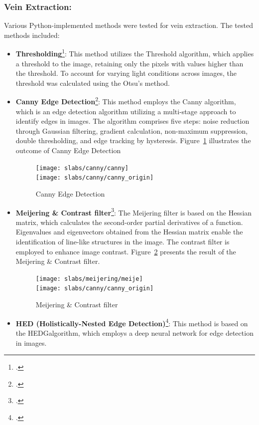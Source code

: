\subsubsection{Vein Extraction:}
Various Python-implemented methods were tested for vein extraction. 
The tested methods included:
\begin{itemize}
    \item \textbf{Thresholding}\footcite{site:opencv-threshold}: This method utilizes the Threshold algorithm, which applies a threshold to the image, retaining only the pixels with values higher than the threshold. 
    To account for varying light conditions across images, the threshold was calculated using the Otsu's method.
    \item \textbf{Canny Edge Detection}\footcite{site:opencv-canny}: This method employs the Canny algorithm, which is an edge detection algorithm utilizing a multi-stage approach to identify edges in images. 
    The algorithm comprises five steps: noise reduction through Gaussian filtering, gradient calculation, non-maximum suppression, double thresholding, and edge tracking by hysteresis. 
    Figure~\ref{fig:canny_compare} illustrates the outcome of Canny Edge Detection
    \begin{figure}[H]
        \centering
        \texttt{[image: slabs/canny/canny]}
        \\
        \texttt{[image: slabs/canny/canny\_origin]}
        \caption{Canny Edge Detection}\label{fig:canny_compare}
    \end{figure}
    \item \textbf{Meijering \& Contrast filter}\footcite{site:sckit-meijering}: The Meijering filter is based on the Hessian matrix, which calculates the second-order partial derivatives of a function. 
    Eigenvalues and eigenvectors obtained from the Hessian matrix enable the identification of line-like structures in the image. 
    The contrast filter is employed to enhance image contrast. 
    Figure~\ref{fig:meij_compare} presents the result of the Meijering \& Contrast filter.
    \begin{figure}[H]
        \centering
        \texttt{[image: slabs/meijering/meije]}
        \\
        \texttt{[image: slabs/canny/canny\_origin]}
        \caption{Meijering \& Contrast filter}\label{fig:meij_compare}
    \end{figure}
    \item \textbf{HED (Holistically-Nested Edge Detection)}\footcite{paper:hed}: This method is based on the \gls{HEDG}\glsfirstoccur algorithm, which employs a deep neural network for edge detection in images. 

\end{itemize}
